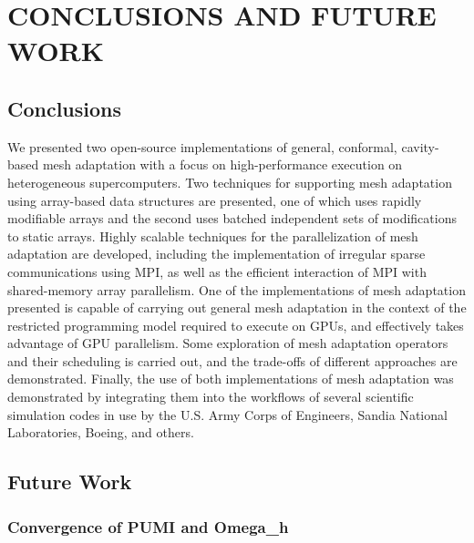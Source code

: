 
\chapter{CONCLUSIONS AND FUTURE WORK}

\section{Conclusions}

We presented two open-source implementations of general, conformal,
cavity-based mesh adaptation with a focus on high-performance
execution on heterogeneous supercomputers.
Two techniques for supporting mesh adaptation using array-based
data structures are presented, one of which uses rapidly modifiable
arrays and the second uses batched independent sets of modifications
to static arrays.
Highly scalable techniques for the parallelization of mesh adaptation are
developed, including the implementation of irregular sparse
communications using MPI, as well as the efficient interaction of
MPI with shared-memory array parallelism.
One of the implementations of mesh adaptation presented is capable of carrying out
general mesh adaptation in the context of the restricted programming
model required to execute on GPUs, and effectively takes advantage
of GPU parallelism.
Some exploration of mesh adaptation operators and their scheduling
is carried out, and the trade-offs of different approaches are
demonstrated.
Finally, the use of both implementations of mesh adaptation was demonstrated
by integrating them into the workflows of
several scientific simulation codes in use by the U.S. Army Corps of Engineers,
Sandia National Laboratories, Boeing, and others.

\section{Future Work}

\subsection{Convergence of PUMI and Omega\_h}
\label{sec:converge}

